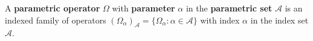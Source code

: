 \documentclass[12pt]{article}
\begin{document}
A \textbf{parametric operator} $\Omega$ with \textbf{parameter} $\alpha$ in the \textbf{parametric set} $\mathcal{A}$ is an indexed family of operators $(\Omega_{\alpha})_{\mathcal{A}} = \{ \Omega_{\alpha} : \alpha \in \mathcal{A} \}$ with index $\alpha$ in the index set $\mathcal{A}$.

\end{document}
